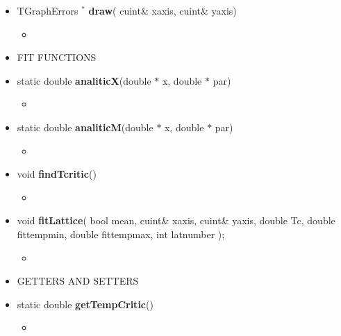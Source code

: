 \begin{itemize}
\begin{itemize}
			\item[] TGraphErrors ${}^*$ \textbf{draw}(
                             cuint\& x\textunderscore axis,
                             cuint\& y\textunderscore axis)		 
			\begin{itemize}
				\item[] 
			\end{itemize}		

                           
		\item[] FIT FUNCTIONS \\
				
			\item[] static double \textbf{analiticX}(double $*$ x, double $*$ par)	 
			\begin{itemize}
				\item[] 
			\end{itemize}
			
			\item[] static double \textbf{analiticM}(double $*$ x, double $*$ par)			 
			\begin{itemize}
				\item[] 
			\end{itemize}
			
			\item[] void \textbf{findTcritic}()		 
			\begin{itemize}
				\item[] 
			\end{itemize}
			
			\item[] void \textbf{fitLattice}( bool mean,
                            				  cuint\& x\textunderscore axis,
                            				  cuint\& y\textunderscore axis,
                            				  double Tc,
                            				  double fit\textunderscore temp\textunderscore min,
                            				  double fit\textunderscore temp\textunderscore max,
                           					  int lat\textunderscore number
				                            );		 
			\begin{itemize}
				\item[] 
			\end{itemize}
			
\newpage
			
		\item[]	GETTERS AND SETTERS \\
	
			\item[] static double \textbf{getTempCritic}()		 
			\begin{itemize}
				\item[] 
			\end{itemize}
			

\end{itemize}
\end{itemize}
